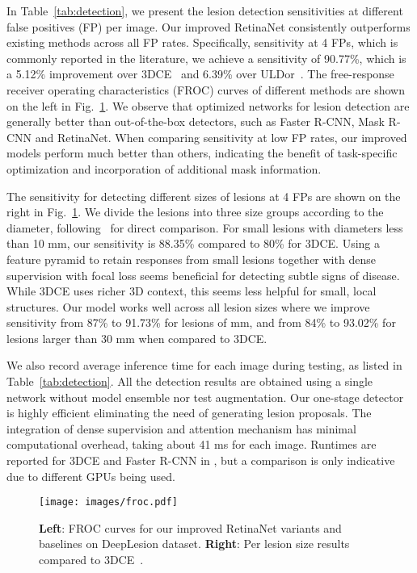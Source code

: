 \documentclass[runningheads,a4paper]{llncs}
\begin{document}
In Table~\ref{tab:detection}, we present the lesion detection sensitivities at different false positives (FP) per image. Our improved RetinaNet consistently outperforms existing methods across all FP rates. Specifically, sensitivity at 4 FPs, which is commonly reported in the literature, we achieve a sensitivity of 90.77\%, which is a 5.12\% improvement over 3DCE~\cite{yan20183dce} and 6.39\% over ULDor~\cite{tang2019uldor}.
The free-response receiver operating characteristics (FROC) curves of different methods are shown on the left in Fig.~\ref{fig:froc}. We observe that optimized networks for lesion detection are generally better than out-of-the-box detectors, such as Faster R-CNN, Mask R-CNN and RetinaNet.
When comparing sensitivity at low FP rates, our improved models perform much better than others, indicating the benefit of task-specific optimization and incorporation of additional mask information.

The sensitivity for detecting different sizes of lesions at 4 FPs are shown on the right in Fig.~\ref{fig:froc}. We divide the lesions into three size groups according to the diameter, following~\cite{yan20183dce} for direct comparison. For small lesions with diameters less than 10 mm, our sensitivity is 88.35\% compared to 80\% for 3DCE.
Using a feature pyramid to retain responses from small lesions together with dense supervision with focal loss seems beneficial for detecting subtle signs of disease.
While 3DCE uses richer 3D context, this seems less helpful for small, local structures.
Our model works well across all lesion sizes where we improve sensitivity from 87\% to 91.73\% for lesions of  mm, and from 84\% to 93.02\% for lesions larger than 30 mm when compared to 3DCE.

We also record average inference time for each image during testing, as listed in Table~\ref{tab:detection}.
All the detection results are obtained using a single network without model ensemble nor test augmentation.
Our one-stage detector is highly efficient eliminating the need of generating lesion proposals. The integration of dense supervision and attention mechanism has minimal computational overhead, taking about 41 ms for each image.
Runtimes are reported for 3DCE and Faster R-CNN in \cite{yan20183dce}, but a comparison is only indicative due to different GPUs being used.

\begin{figure}[t]
  \centering
  \texttt{[image: images/froc.pdf]}
  \vspace{-4mm}
  \caption{\textbf{Left}: FROC curves for our improved RetinaNet variants and baselines on DeepLesion dataset. \textbf{Right}: Per lesion size results compared to 3DCE~\cite{yan20183dce}.}
  \vspace{-3mm}
  \label{fig:froc}
\end{figure}
\end{document}
